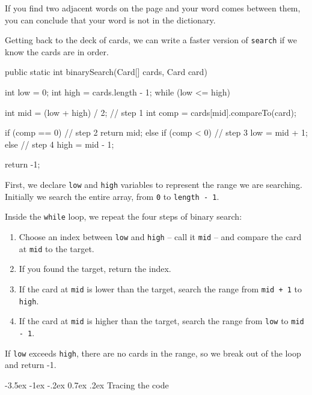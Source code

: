 \documentclass[12pt]{book}
\makeatletter
\theoremstyle{exercise}
\newcommand{\java}[1]{\verb"#1"}
\renewcommand{\section}{\@startsection{section}{1}{\z@}%
    {-3.5ex \@plus -1ex \@minus -.2ex}%
    {0.7ex \@plus.2ex}%
    {\normalfont\Large\bfseries}}
\newcommand{\java}[1]{\lstinline{#1}} %
\makeatother
\begin{document}
If you find two adjacent words on the page and your word comes between them, you can conclude that your word is not in the dictionary.

Getting back to the deck of cards, we can write a faster version of \java{search} if we know the cards are in order.

\begin{code}
public static int binarySearch(Card[] cards, Card card) {
    int low = 0;
    int high = cards.length - 1;
    while (low <= high) {
        int mid = (low + high) / 2;                   // step 1
        int comp = cards[mid].compareTo(card);

        if (comp == 0) {                              // step 2
            return mid;
        } else if (comp < 0) {                        // step 3
            low = mid + 1;
        } else {                                      // step 4
            high = mid - 1;
        }
    }
    return -1;
}
\end{code}

First, we declare \java{low} and \java{high} variables to represent the range we are searching.
Initially we search the entire array, from \java{0} to \java{length - 1}.

Inside the \java{while} loop, we repeat the four steps of binary search:

\begin{enumerate}

\item Choose an index between \java{low} and \java{high}  --  call it \java{mid}  --  and compare the card at \java{mid} to the target.

\item If you found the target, return the index.

\item If the card at \java{mid} is lower than the target, search the range from \java{mid + 1} to \java{high}.

\item If the card at \java{mid} is higher than the target, search the range from \java{low} to \java{mid - 1}.

\end{enumerate}

If \java{low} exceeds \java{high}, there are no cards in the range, so we break out of the loop and return -1.




\section{Tracing the code}
\end{document}
